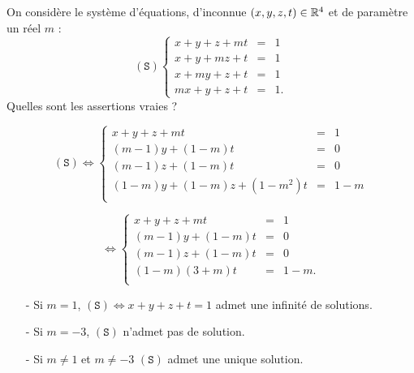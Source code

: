 \begin{question}
On considère le système d'équations, d'inconnue $(x,y,z,t)\in \mathbb{R}^4$  et de paramètre un réel  $m$ : 
$$(\mathtt{S})  
\left\{\begin{array}{rcc}
x+y+z+mt&=&1 \\
x+y+mz+t&=&1\\
x+my+z+t&=&1\\ 
mx+y+z+t&=&1.\end{array}\right.$$
Quelles sont les assertions vraies ?
\begin{answers}  
\end{answers}
\begin{explanations} 
$$(\mathtt{S}) \Leftrightarrow  
\left\{\begin{array}{rcc}
x+y+z+mt&=&1\\
(m-1)y+(1-m)t&=&0\\ 
(m-1)z+(1-m)t&=&0 \\
(1-m)y+(1-m)z+(1-m^2)t&=&1-m\\
\end{array}\right.
$$

$$\Leftrightarrow  
\left\{\begin{array}{rcc}
x+y+z+mt&=&1\\
(m-1)y+(1-m)t&=&0\\ 
(m-1)z+(1-m)t&=&0 \\
(1-m)(3+m)t&=&1-m. \\
\end{array}\right. $$
\begin{enumerate}
\item[-]Si $m=1$, $(\mathtt{S}) \Leftrightarrow  x+y+z+t=1 $ admet une infinité de solutions.
\item[-]Si $m=-3$, $(\mathtt{S})$ n'admet pas de solution.
\item[-]Si $m\neq 1$ et $m\neq -3$ $(\mathtt{S})$ admet une unique solution.
\end{enumerate}
\end{explanations}
\end{question}

